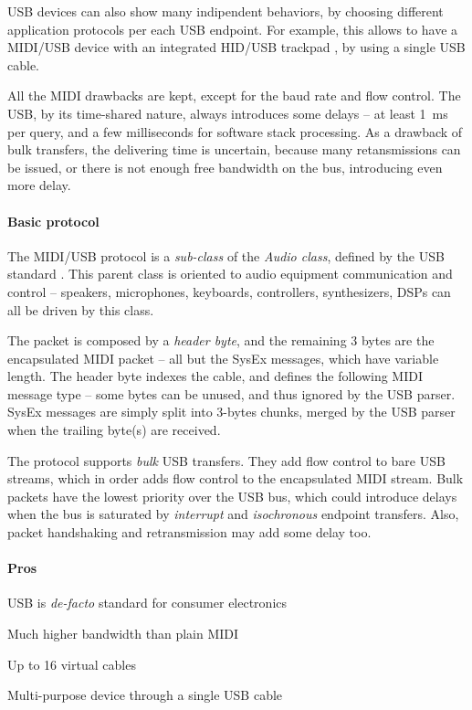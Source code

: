 \documentclass[a4paper,10pt]{article}
\begin{document}
\begin{multicols}{2}
USB devices can also show many indipendent behaviors, by choosing different
application protocols per each USB endpoint. For example, this allows to have
a MIDI/USB device with an integrated HID/USB trackpad \CITEME, by using a
single USB cable.

All the MIDI drawbacks are kept, except for the baud rate and flow control.
The USB, by its time-shared nature, always introduces some delays -- at
least 1~ms per query, and a few milliseconds for software stack processing.
As a drawback of bulk transfers, the delivering time is uncertain, because
many retansmissions can be issued, or there is not enough free bandwidth on
the bus, introducing even more delay.


\paragraph{Basic protocol}
The MIDI/USB protocol is a \emph{sub-class} of the \emph{Audio class}, defined
by the USB standard \CITEME. This parent class is oriented to audio equipment
communication and control -- speakers, microphones, keyboards, controllers,
synthesizers, DSPs can all be driven by this class.

The packet is composed by a \emph{header byte}, and the remaining 3 bytes are
the encapsulated MIDI packet -- all but the SysEx messages, which have variable
length. The header byte indexes the cable, and defines the following MIDI
message type -- some bytes can be unused, and thus ignored by the USB parser.
SysEx messages are simply split into 3-bytes chunks, merged by the USB parser
when the trailing byte(s) are received.

The protocol supports \emph{bulk} USB transfers. They add flow control to bare
USB streams, which in order adds flow control to the encapsulated MIDI stream.
Bulk packets have the lowest priority over the USB bus, which could introduce
delays when the bus is saturated by \emph{interrupt} and \emph{isochronous}
endpoint transfers. Also, packet handshaking and retransmission may add
some delay too.


\paragraph{Pros}
\begin{itemize*}
	\item USB is \emph{de-facto} standard for consumer electronics
	\item Much higher bandwidth than plain MIDI
	\item Up to 16 virtual cables
	\item Multi-purpose device through a single USB cable
\end{itemize*}



\end{multicols}
\end{document}
